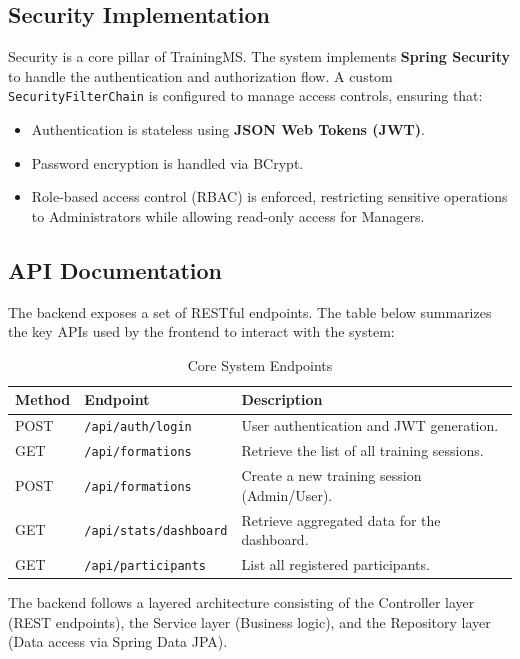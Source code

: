 \subsection{Security Implementation}
Security is a core pillar of TrainingMS. The system implements \textbf{Spring Security} to handle the authentication and authorization flow. A custom \texttt{SecurityFilterChain} is configured to manage access controls, ensuring that:
\begin{itemize}
    \item Authentication is stateless using \textbf{JSON Web Tokens (JWT)}.
    \item Password encryption is handled via BCrypt.
    \item Role-based access control (RBAC) is enforced, restricting sensitive operations to Administrators while allowing read-only access for Managers.
\end{itemize}

\subsection{API Documentation}
The backend exposes a set of RESTful endpoints. The table below summarizes the key APIs used by the frontend to interact with the system:

\begin{table}[H]
    \centering
    \begin{tabular}{|l|l|l|}
        \hline
        \textbf{Method} & \textbf{Endpoint} & \textbf{Description} \\ \hline
        POST & \texttt{/api/auth/login} & User authentication and JWT generation. \\ \hline
        GET & \texttt{/api/formations} & Retrieve the list of all training sessions. \\ \hline
        POST & \texttt{/api/formations} & Create a new training session (Admin/User). \\ \hline
        GET & \texttt{/api/stats/dashboard} & Retrieve aggregated data for the dashboard. \\ \hline
        GET & \texttt{/api/participants} & List all registered participants. \\ \hline
    \end{tabular}
    \caption{Core System Endpoints}
    \label{tab_api_endpoints}
\end{table}

The backend follows a layered architecture consisting of the Controller layer (REST endpoints), the Service layer (Business logic), and the Repository layer (Data access via Spring Data JPA).

